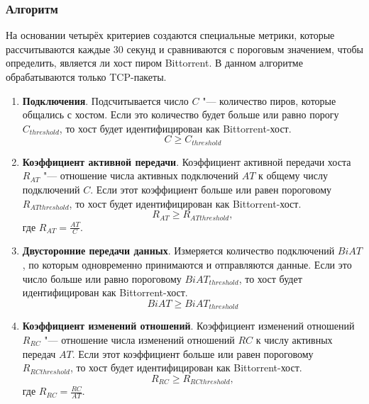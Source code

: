 \documentclass[bachelor, och, coursework]{SCWorks}
\begin{document}
\subsubsection{Алгоритм}
На основании четырёх критериев создаются специальные метрики, которые рассчитываются каждые 30 секунд
и сравниваются с пороговым значением, чтобы определить, является ли хост пиром Bittorrent. В данном алгоритме
обрабатываются только TCP-пакеты. 

\begin{enumerate}
    \item \textbf{Подключения}. Подсчитывается число $C$ "--- количество пиров, которые общались с хостом. Если это количество будет больше или равно порогу $C_{threshold}$, то хост будет идентифицирован как Bittorrent-хост.
    \[ C \geq C_{threshold} \]
    
    \item \textbf{Коэффициент активной передачи}. Коэффициент активной передачи хоста $R_{AT}$ "--- отношение числа активных подключений $AT$ к общему числу подключений $C$.
    Если этот коэффициент больше или равен пороговому $R_{ATthreshold}$, то хост будет идентифицирован как Bittorrent-хост.
    \[ R_{AT} \geq R_{ATthreshold}, \]
    где $R_{AT} = \frac{AT}{C}$.

    \item \textbf{Двусторонние передачи данных}. Измеряется количество подключений $BiAT$, по которым одновременно принимаются и отправляются данные. 
    Если это число больше или равно пороговому $BiAT_{threshold}$, то хост будет идентифицирован как Bittorrent-хост.
    \[ BiAT \geq BiAT_{threshold} \]

    \item \textbf{Коэффициент изменений отношений}. Коэффициент изменений отношений $R_{RC}$ "--- отношение числа изменений отношений $RC$ к числу активных передач $AT$.
    Если этот коэффициент больше или равен пороговому $R_{RCthreshold}$, то хост будет идентифицирован как Bittorrent-хост.
    \[ R_{RC} \geq R_{RCthreshold}, \]
    где $R_{RC} = \frac{RC}{AT}$.
\end{enumerate}


\end{document}
